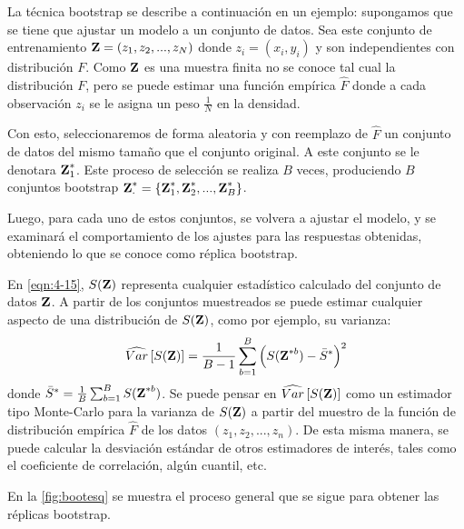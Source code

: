 La técnica bootstrap se describe a continuación en un ejemplo: supongamos que se tiene que ajustar un modelo a un conjunto de datos. Sea este conjunto de entrenamiento $\textbf{Z} = (z_1, z_2, ..., z_N)$ donde $z_i = (x_i, y_i)$ y son independientes con distribución $F$. Como $\textbf{Z}$ es una muestra finita no se conoce tal cual la distribución $F$, pero se puede estimar una función empírica $\hat F$ donde a cada observación $z_i$ se le asigna un peso $\frac{1}{N}$ en la densidad.

Con esto, seleccionaremos de forma aleatoria y con reemplazo de $\hat{F}$ un conjunto de datos del mismo tamaño que el conjunto original. A este conjunto se le denotara $\textbf{Z}^{*}_1$. Este proceso de selección se realiza $B$ veces, produciendo $B$ conjuntos bootstrap $\textbf{Z}^{*}_{\cdot} = \lbrace \textbf{Z}^{*}_1, \textbf{Z}^{*}_2, ..., \textbf{Z}^{*}_B \rbrace$. 

Luego, para cada uno de estos conjuntos, se volvera a ajustar el modelo, y se examinará el comportamiento de los ajustes para las respuestas obtenidas, obteniendo lo que se conoce como réplica bootstrap.

En \eqref{eqn:4-15}, $S(\textbf{Z})$ representa cualquier estadístico calculado del conjunto de datos $\textbf{Z}$. A partir de los conjuntos muestreados se puede estimar cualquier aspecto de una distribución de $S(\textbf{Z})$, como por ejemplo, su varianza: 
\begin{equation}
\widehat{Var} \left[ S(\textbf{Z}) \right] = \frac{1}{B-1} \sum_{b=1}^B \left( S(\textbf{Z}^{*b}) - \bar{S}^{*} \right)^2
\label{eqn:4-15}
\end{equation}
donde $\bar{S}^{*} = \frac{1}{B} \sum_{b=1}^B S(\textbf{Z}^{*b})$. Se puede pensar en $\widehat{Var} \left[ S(\textbf{Z}) \right]$ como un estimador tipo Monte-Carlo para la varianza de $S(\textbf{Z})$ a partir del muestro de la función de distribución empírica $\widehat{F}$ de los datos $(z_1, z_2, ..., z_n)$. De esta misma manera, se puede calcular la desviación estándar de otros estimadores de interés, tales como el coeficiente de correlación, algún cuantil, etc.

En la \autoref{fig:bootesq} se muestra el proceso general que se sigue para obtener las réplicas bootstrap.

